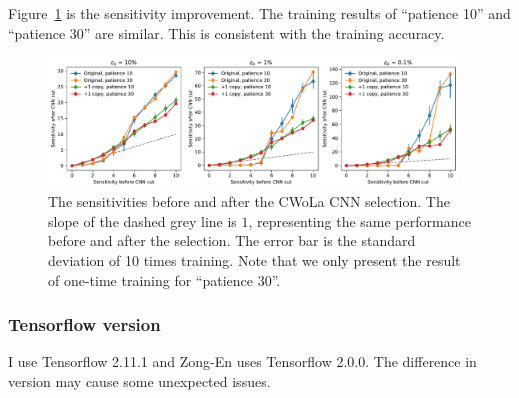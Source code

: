 \documentclass[12pt]{article}
\begin{document}
            Figure~\ref{fig:sensitivity_improvement_bkg_eff_patience_30} is the sensitivity improvement. The training results of ``patience 10'' and ``patience 30'' are similar. This is consistent with the training accuracy. 
            \begin{figure}[htpb]
                \centering
                \includegraphics[width=0.97\textwidth]{HVmodel_sensitivity_improvement_bkg_eff_origin_copy_1_patience_30.pdf}
                \caption{The sensitivities before and after the CWoLa CNN selection. The slope of the dashed grey line is $1$, representing the same performance before and after the selection. The error bar is the standard deviation of 10 times training. Note that we only present the result of one-time training for ``patience 30''.}
                \label{fig:sensitivity_improvement_bkg_eff_patience_30}
            \end{figure}
        \subsubsection{Tensorflow version}%
        \label{subs:tensorflow_version}
            I use Tensorflow 2.11.1 and Zong-En uses Tensorflow 2.0.0. The difference in version may cause some unexpected issues.
\end{document}
